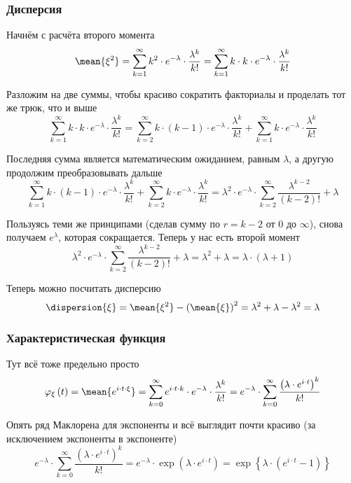 \subsubsection{Дисперсия}
Начнём с расчёта второго момента
$$\mean{\xi^2}
    = \sum_{k=1}^\infty k^2 \cdot e^{-\lambda} \cdot \frac{\lambda^k}{k!}
    = \sum_{k=1}^\infty k \cdot k
        \cdot e^{-\lambda} \cdot \frac{\lambda^k}{k!}$$

Разложим на две суммы, чтобы красиво сократить факториалы
и проделать тот же трюк, что и выше
$$\sum_{k=1}^\infty k\cdot k \cdot e^{-\lambda} \cdot \frac{\lambda^k}{k!}
    = \sum_{k=2}^\infty k \cdot \left( k - 1 \right)
        \cdot e^{-\lambda} \cdot \frac{\lambda^k}{k!}
        + \sum_{k=1}^\infty k \cdot e^{-\lambda} \cdot \frac{\lambda^k}{k!}$$

Последняя сумма является математическим ожиданием, равным $\lambda$,
а другую продолжим преобразовывать дальше
$$\sum_{k=1}^\infty k \cdot \left( k - 1 \right) \cdot e^{-\lambda}
        \cdot \frac{\lambda^k}{k!}
        + \sum_{k=2}^\infty k \cdot e^{-\lambda} \cdot \frac{\lambda^k}{k!}
    = \lambda^2 \cdot e^{-\lambda}
        \cdot \sum_{k=2}^\infty \frac{\lambda^{k-2}}{\left( k-2 \right)!}
        + \lambda$$

Пользуясь теми же принципами (сделав сумму по $r=k-2$ от $0$ до $\infty$),
снова получаем $e^\lambda$, которая сокращается.
Теперь у нас есть второй момент
$$\lambda^2 \cdot e^{-\lambda}
    \cdot \sum_{k=2}^\infty \frac{\lambda^{k-2}}{\left( k-2 \right)!} + \lambda
    = \lambda^2 + \lambda
    = \lambda \cdot \left( \lambda + 1 \right)$$

Теперь можно посчитать дисперсию
$$\dispersion{\xi}
    = \mean{\xi^2} - \left( \mean{\xi} \right)^2
    = \lambda^2 + \lambda - \lambda^2
    = \lambda$$
\subsubsection{Характеристическая функция}
Тут всё тоже предельно просто
$$\varphi_{\xi}\left( t \right)
    = \mean{e^{i \cdot t \cdot \xi}}
    = \sum_{k=0}^\infty e^{i \cdot t \cdot k}
        \cdot e^{-\lambda} \cdot \frac{\lambda^k}{k!}
    = e^{-\lambda} \cdot \sum_{k=0}^\infty
        \frac{\left( \lambda \cdot e^{i \cdot t} \right)^k}{k!}$$

Опять ряд Маклорена для экспоненты и всё выглядит почти красиво
(за исключением экспоненты в экспоненте)
$$e^{-\lambda} \cdot \sum_{k=0}^\infty
        \frac{\left( \lambda \cdot e^{i \cdot t} \right)^k}{k!}
    = e^{-\lambda} \cdot \exp{\left( \lambda \cdot e^{i \cdot t} \right)}
    = \exp{\left\{ \lambda \cdot \left( e^{i \cdot t} - 1 \right) \right\}}$$
